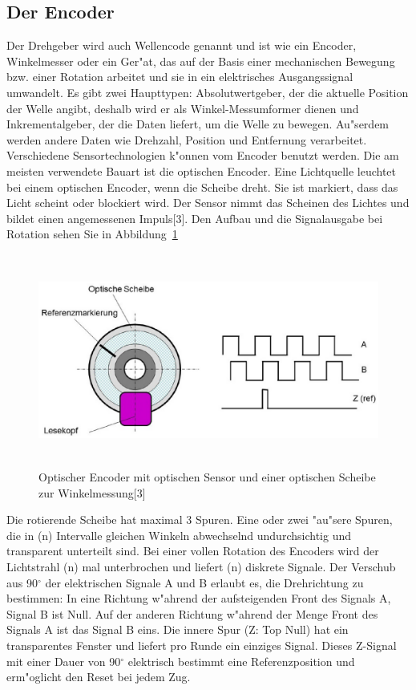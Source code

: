   
  
  
 

\subsection{Der Encoder}
Der Drehgeber wird auch Wellencode genannt und ist wie ein Encoder,
 Winkelmesser oder ein Ger"at, 
 das auf der Basis einer mechanischen Bewegung 
 bzw. einer Rotation arbeitet
  und sie in ein elektrisches Ausgangssignal umwandelt. 
  Es gibt zwei Haupttypen: Absolutwertgeber, 
  der die aktuelle Position der Welle angibt, 
  deshalb wird er als Winkel-Messumformer dienen und Inkrementalgeber, 
  der die Daten liefert, um die Welle zu bewegen. 
  Au"serdem werden andere Daten wie Drehzahl, 
  Position und Entfernung verarbeitet. 
  Verschiedene Sensortechnologien k"onnen vom Encoder benutzt werden. 
Die am meisten verwendete Bauart ist die optischen Encoder.
  Eine Lichtquelle leuchtet bei einem optischen Encoder, 
  wenn die Scheibe dreht. 
  Sie ist markiert, dass das Licht scheint oder blockiert wird. 
  Der Sensor nimmt das Scheinen des Lichtes 
  und bildet einen angemessenen Impuls[3].
  Den Aufbau und die Signalausgabe bei Rotation sehen Sie 
  in Abbildung~\ref{fig:Encoder} 
\begin{figure}[!htb]
\begin{center}
\includegraphics[height=7cm]{bilder/Encoder.eps}
\end{center}
\caption{Optischer Encoder mit optischen Sensor und einer optischen Scheibe zur Winkelmessung[3]}\label{fig:Encoder}

\end{figure}


Die rotierende Scheibe hat maximal 3 Spuren.
Eine oder zwei "au"sere Spuren, 
die in (n) Intervalle gleichen Winkeln abwechselnd undurchsichtig 
und transparent unterteilt sind.  
 Bei einer
vollen Rotation des Encoders wird 
der Lichtstrahl (n) mal unterbrochen und liefert (n) diskrete Signale. 
Der Verschub aus 90$^\circ$ der elektrischen Signale A und B erlaubt es, 
die Drehrichtung zu bestimmen:  
 \newline
In eine Richtung w"ahrend der aufsteigenden Front des Signals A, 
Signal B ist Null. 
Auf der anderen Richtung w"ahrend der Menge Front des Signals A ist 
das Signal B eins.
Die innere Spur (Z: Top Null) hat ein transparentes Fenster und 
liefert pro Runde ein einziges Signal. 
Dieses Z-Signal mit einer Dauer von 90$^\circ$ elektrisch 
bestimmt eine Referenzposition und erm"oglicht den Reset bei jedem Zug. 

